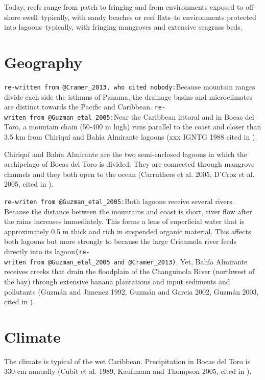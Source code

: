 \documentclass[]{book}
\begin{document}
Today, reefs range from patch to fringing and from environments exposed
to off-shore swell--typically, with sandy beaches or reef flats--to
environments protected into lagoons--typically, with fringing mangroves
and extensive seagrass beds.

\section{Geography}\label{geography}

\texttt{re-written\ from\ @Cramer\_2013,\ who\ cited\ nobody:}Because
mountain ranges divide each side the isthmus of Panama, the drainage
basins and microclimates are distinct towards the Pacific and Caribbean.
\texttt{re-writen\ from\ @Guzman\_etal\_2005:}Near the Caribbean
littoral and in Bocas del Toro, a mountain chain (50-400 m high) runs
parallel to the coast and closer than 3.5 km from Chiriquí and Bahía
Almirante lagoons (xxx IGNTG 1988 cited in \citet{Guzman_etal_2005}).

Chiriquí and Bahía Almirante are the two semi-enclosed lagoons in which
the archipelago of Bocas del Toro is divided. They are connected through
mangrove channels and they both open to the ocean (Carruthers et al.
2005, D'Croz et al. 2005, cited in \citet{Schloder_etal_2013}).

\texttt{re-writen\ from\ @Guzman\_etal\_2005:}Both lagoons receive
several rivers. Because the distance between the mountains and coast is
short, river flow after the rains increases immediately. This forms a
lens of superficial water that is approximately 0.5 m thick and rich in
suspended organic material. This affects both lagoons but more strongly
to because the large Cricamola river feeds directly into its
lagoon\texttt{(re-writen\ from\ @Guzman\_etal\_2005\ and\ @Cramer\_2013)}.
Yet, Bahía Almirante receives creeks that drain the floodplain of the
Changuinola River (northwest of the bay) through extensive banana
plantations and input sediments and pollutants (Guzmán and Jimenez 1992,
Guzmán and Garcia 2002, Guzmán 2003, cited in \citet{Cramer_2013}).

\section{Climate}\label{climate}

The climate is typical of the wet Caribbean. Precipitation in Bocas del
Toro is 330 cm annually (Cubit et al. 1989, Kaufmann and Thompson 2005,
cited in \citet{Cramer_2013}).
\end{document}
